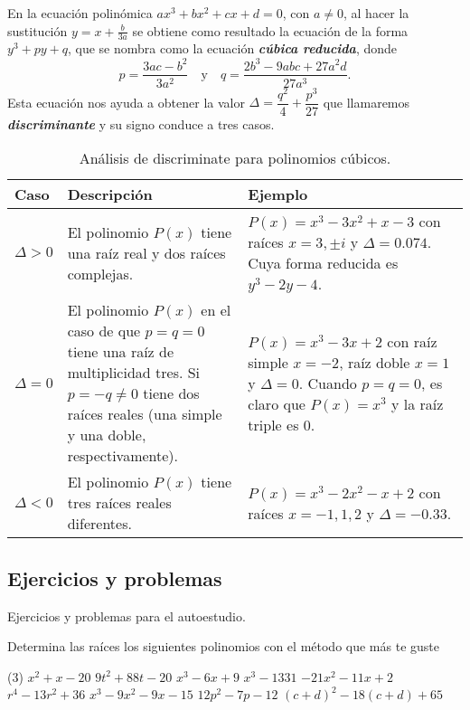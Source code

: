 En la ecuación polinómica $ax^3 + bx^2 + cx + d = 0$, con $a \neq 0$, al hacer la sustitución $y = x + \frac{b}{3a}$ se obtiene como resultado la ecuación de la forma $y^3 + py + q$, que se nombra como la ecuación \textbf{\emph{cúbica reducida}},
donde
\[
    p = \frac{3ac - b^2}{3a^2}\quad\text{y}\quad q = \frac{2b^3 - 9abc + 27a^2 d}{27a^3}.
\]
Esta ecuación nos ayuda a obtener la valor $\Delta = \dfrac{q^2}{4} + \dfrac{p^3}{27}$ que llamaremos \textbf{\emph{discriminante}} y su signo conduce a tres casos.
\begin{table}[H]
    \centering
    \begin{tabular}{| p{1.4cm} | p{6.5cm} | p{6.5cm} |}
        \hline
        Caso & Descripción & Ejemplo \\ \hline
        $\Delta > 0$ & El polinomio $P(x)$ tiene una raíz real y dos raíces complejas.&
            $P(x) = x^3 - 3x^2 + x - 3$ con raíces $x = 3, \pm i$ y $\Delta = 0.074$.
            Cuya forma reducida es $y^3 - 2y - 4$. \\\hline
        $\Delta = 0$ & El polinomio $P(x)$ en el caso de que $p = q = 0$ tiene una raíz de multiplicidad tres.
        Si $p = -q \neq 0$ tiene dos raíces reales (una simple y una doble, respectivamente).&
            $P(x) = x^3 - 3x + 2$ con raíz simple $x = -2$, raíz doble $x = 1$ y $\Delta = 0$.
            Cuando $p = q = 0$, es claro que $P(x) = x^3$ y la raíz triple es 0.\\\hline
        $\Delta < 0$ & El polinomio $P(x)$ tiene tres raíces reales diferentes.&
            $P(x) = x^3 - 2x^2 - x + 2$ con raíces $x = -1, 1, 2$ y $\Delta = -0.33$. \\\hline
    \end{tabular}
    \caption{Análisis de discriminate para polinomios cúbicos.}
\end{table}



\subsection{Ejercicios y problemas}

Ejercicios y problemas para el autoestudio.

\begin{exercise}
    Determina las raíces los siguientes polinomios con el método que más te guste
    \begin{tasks}(3)
        \task $x^2 + x - 20$
        \task $9t^2 + 88t - 20$
        \task $x^3 - 6x + 9$
        \task $x^3 - 1331$
        \task $-21x^2 - 11x + 2$
        \task $r^4 - 13r^2 + 36$
        \task $x^3 - 9x^2 - 9x - 15$
        \task $12p^2 - 7p - 12$
        \task $(c + d)^2 - 18(c + d) + 65$
    \end{tasks}
\end{exercise}

